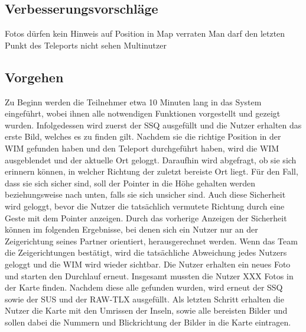 \subsection{Verbesserungsvorschläge}
Fotos dürfen kein Hinweis auf Position in Map verraten
Man darf den letzten Punkt des Teleports nicht sehen
Multinutzer



\subsection{Vorgehen}


Zu Beginn werden die Teilnehmer etwa 10 Minuten lang in das System eingeführt, wobei ihnen alle notwendigen Funktionen vorgestellt und gezeigt wurden.
Infolgedessen wird zuerst der SSQ ausgefüllt und die Nutzer erhalten das erste Bild, welches es zu finden gilt. Nachdem sie die richtige Position in der WIM gefunden haben und den Teleport durchgeführt haben, wird die WIM ausgeblendet und der aktuelle Ort geloggt. Daraufhin wird abgefragt, ob sie sich erinnern können, in welcher Richtung der zuletzt bereiste Ort liegt. Für den Fall, dass sie sich sicher sind, soll der Pointer in die Höhe gehalten werden beziehungsweise nach unten, falls sie sich unsicher sind. Auch diese Sicherheit wird geloggt, bevor die Nutzer die tatsächlich vermutete Richtung durch eine Geste mit dem Pointer anzeigen. Durch das vorherige Anzeigen der Sicherheit können im folgenden Ergebnisse, bei denen sich ein Nutzer nur an der Zeigerichtung seines Partner orientiert, herausgerechnet werden.
Wenn das Team die Zeigerichtungen bestätigt, wird die tatsächliche Abweichung jedes Nutzers geloggt und die WIM wird wieder sichtbar. Die Nutzer erhalten ein neues Foto und starten den Durchlauf erneut.
Insgesamt mussten die Nutzer XXX Fotos in der Karte finden.
Nachdem diese alle gefunden wurden, wird erneut der SSQ sowie der SUS und der RAW-TLX ausgefüllt.
Als letzten Schritt erhalten die Nutzer die Karte mit den Umrissen der Inseln, sowie alle bereisten Bilder und sollen dabei die Nummern und Blickrichtung der Bilder in die Karte eintragen. 
